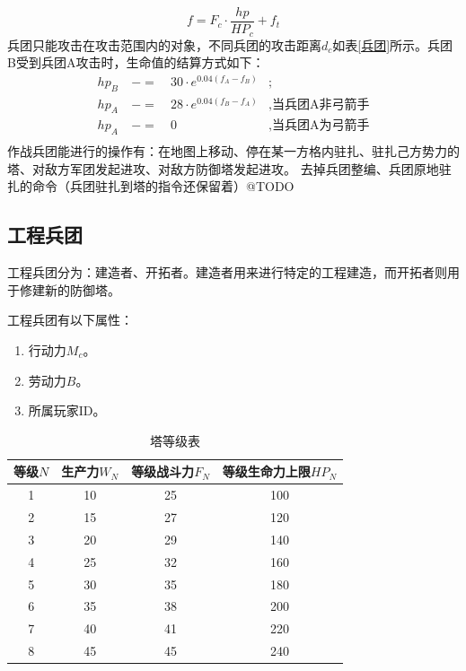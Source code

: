 \documentclass[a4paper,4pt]{article}
\begin{document}
\begin{equation}
	f = F_c \cdot \frac{hp}{HP_c} + f_t\label{f2}
\end{equation}
兵团只能攻击在攻击范围内的对象，不同兵团的攻击距离$d_c$如表\ref{兵团}所示。兵团B受到兵团A攻击时，生命值的结算方式如下：
\begin{equation}
	\begin{aligned}
		hp_{B} & \ -= & \ 30 \cdot e^{0.04(f_{A}-f_{B})} & ;                        \\
		hp_{A} & \ -= & \ 28 \cdot e^{0.04(f_{B}-f_{A})} & , \text{当兵团A非弓箭手} \\
		hp_{A} & \ -= & \ 0                              & , \text{当兵团A为弓箭手} \\
	\end{aligned}
	\label{hp2}
\end{equation}
作战兵团能进行的操作有：在地图上移动、停在某一方格内驻扎、驻扎己方势力的塔、对敌方军团发起进攻、对敌方防御塔发起进攻。
去掉兵团整编、兵团原地驻扎的命令（兵团驻扎到塔的指令还保留着）@TODO%
\subsection{工程兵团}
工程兵团分为：建造者、开拓者。建造者用来进行特定的工程建造，而开拓者则用于修建新的防御塔。\par
工程兵团有以下属性：
\begin{enumerate}[fullwidth, itemindent=2em, label=(\arabic*)]
	\item 行动力$M_c$。
	\item 劳动力$B$。
	\item 所属玩家ID。
\end{enumerate}



\begin{table}[htbp]
	\centering
	\caption{塔等级表}
	\label{塔等级表}%
	\begin{tabular}{c|c|c|c}
		\hline
		等级$N$ & 生产力$W_N$ & 等级战斗力$F_N$ & 等级生命力上限$HP_N$ \bigstrut \\
		\hline
		1       & 10          & 25              & 100 \bigstrut                  \\
		\hline
		2       & 15          & 27              & 120 \bigstrut                  \\
		\hline
		3       & 20          & 29              & 140 \bigstrut                  \\
		\hline
		4       & 25          & 32              & 160 \bigstrut                  \\
		\hline
		5       & 30          & 35              & 180 \bigstrut                  \\
		\hline
		6       & 35          & 38              & 200 \bigstrut                  \\
		\hline
		7       & 40          & 41              & 220 \bigstrut                  \\
		\hline
		8       & 45          & 45              & 240 \bigstrut                  \\
		\hline
	\end{tabular}%

\end{table}%
\end{document}
